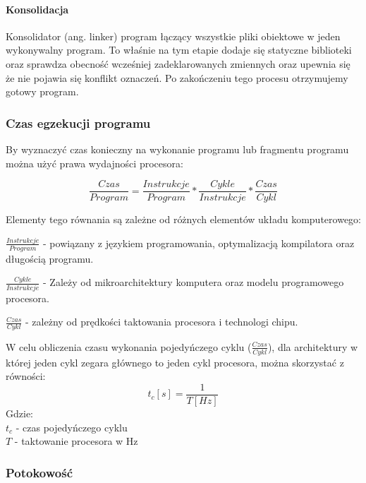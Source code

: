 \paragraph{Konsolidacja}
Konsolidator (ang. linker) program łączący wszystkie pliki obiektowe w jeden wykonywalny program. To właśnie na tym etapie dodaje się statyczne biblioteki oraz sprawdza obecność wcześniej zadeklarowanych zmiennych oraz upewnia się że nie pojawia się konflikt oznaczeń. Po zakończeniu tego procesu otrzymujemy gotowy program. 


\subsubsection{Czas egzekucji programu}

By wyznaczyć czas konieczny na wykonanie programu lub fragmentu programu można użyć prawa wydajności procesora\cite{arch}:

\begin{equation}
        \label{Iron Law}
        \frac{Czas}{Program} =  \frac{Instrukcje}{Program} * \frac{Cykle}{Instrukcje} * \frac{Czas}{Cykl}
\end{equation}

Elementy tego równania są zależne od różnych elementów układu komputerowego:
\begin{description}
        \item $\frac{Instrukcje}{Program}$ - powiązany z językiem programowania, optymalizacją kompilatora oraz długością programu. 
        \item $\frac{Cykle}{Instrukcje}$ - Zależy od mikroarchitektury komputera oraz modelu programowego procesora.
        \item $\frac{Czas}{Cykl}$ -  zależny od prędkości taktowania procesora i technologi chipu. 
\end{description} 


W celu obliczenia czasu wykonania pojedyńczego cyklu ($\frac{Czas}{Cykl}$), dla architektury w której jeden cykl zegara głównego to jeden cykl procesora, można skorzystać z równości:
\begin{equation}
        \label{Cykli w sec}
        t_c [s]= \frac{1}{T [Hz]}
\end{equation} 
Gdzie:\\
\indent $t_c$ - czas pojedyńczego cyklu \\
\indent $T$ - taktowanie procesora w Hz

\subsubsection{Potokowość}

